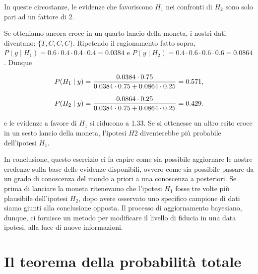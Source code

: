 \documentclass[
  11pt,
]{krantz}
\theoremstyle{definition}
\theoremstyle{definition}
\theoremstyle{definition}
\theoremstyle{definition}
\theoremstyle{remark}
\begin{document}
In queste circostanze, le evidenze che favoriscono \(H_1\) nei confronti di \(H_2\) sono solo pari ad un fattore di 2.

Se otteniamo ancora croce in un quarto lancio della moneta, i nostri dati diventano: \(\{T, C, C, C\}\). Ripetendo il ragionamento fatto sopra, \(P(y \mid H_1) = 0.6 \cdot 0.4 \cdot 0.4 \cdot 0.4 = 0.0384\) e \(P(y \mid H_2) = 0.4 \cdot 0.6 \cdot 0.6 \cdot 0.6 = 0.0864\). Dunque

\begin{equation}
P(H_1 \mid y) = \frac{0.0384 \cdot 0.75}{0.0384 \cdot 0.75 + 0.0864 \cdot 0.25} = 0.571,\notag
\end{equation}

\begin{equation}
P(H_2 \mid y) = \frac{0.0864 \cdot 0.25}{0.0384 \cdot 0.75 + 0.0864 \cdot 0.25} = 0.429.\notag
\end{equation}

e le evidenze a favore di \(H_1\) si riducono a 1.33. Se si ottenesse un altro esito croce in un sesto lancio della moneta, l'ipotesi \(H2\) diventerebbe più probabile dell'ipotesi \(H_1\).

In conclusione, questo esercizio ci fa capire come sia possibile aggiornare le nostre credenze sulla base delle evidenze disponibili, ovvero come sia possibile passare da un grado di conoscenza del mondo a priori a una conoscenza a posteriori. Se prima di lanciare la moneta ritenevamo che l'ipotesi \(H_1\) fosse tre volte più plausibile dell'ipotesi \(H_2\), dopo avere osservato uno specifico campione di dati siamo giunti alla conclusione opposta. Il processo di aggiornamento bayesiano, dunque, ci fornisce un metodo per modificare il livello di fiducia in una data ipotesi, alla luce di nuove informazioni.

\hypertarget{appendix:exrc-abs-prob}{%
\chapter{Il teorema della probabilità totale}\label{appendix:exrc-abs-prob}}
\end{document}
